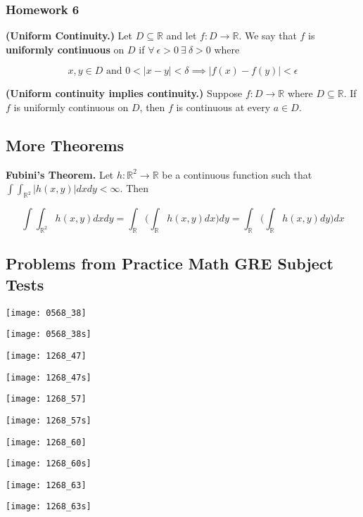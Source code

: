 \subsubsection{Homework 6}

\begin{definition} \textbf{(Uniform Continuity.)} Let \(D \subseteq \mathbb{R}\) and let \(f: D \to \mathbb{R}\). We say that \(f\) is \textbf{uniformly continuous} on \(D\) if \(\forall \ \epsilon > 0 \ \exists \ \delta > 0\) where

\[
x, y \in D \text{ and } 0 < |x - y| < \delta \implies |f(x) - f(y)| < \epsilon
\]

\end{definition}

\begin{theorem} \textbf{(Uniform continuity implies continuity.)} Suppose \(f:D \to \mathbb{R}\) where \(D \subseteq \mathbb{R}\). If \(f\) is uniformly continuous on \(D\), then \(f\) is continuous at every \(a \in D\).

\end{theorem}

\subsection{More Theorems}

\begin{theorem}\label{ra.fubini} \textbf{Fubini's Theorem.} Let \(h: \mathbb{R}^2 \to \mathbb{R}\) be a continuous function such that \(\int \int_{\mathbb{R}^2}|h(x,y)| dxdy < \infty\). Then

\[
\int \int_{\mathbb{R}^2} h(x,y)dxdy = \int_{\mathbb{R}} \bigg( \int_{\mathbb{R} } h(x,y)dx \bigg) dy = \int_{\mathbb{R}} \bigg( \int_{\mathbb{R}} h(x,y)dy \bigg) dx
\]

\end{theorem}

\subsection{Problems from Practice Math GRE Subject Tests}

%

\texttt{[image: 0568\_38]}

\texttt{[image: 0568\_38s]}

\texttt{[image: 1268\_47]}

\texttt{[image: 1268\_47s]}

\texttt{[image: 1268\_57]}

\texttt{[image: 1268\_57s]}

\texttt{[image: 1268\_60]}

\texttt{[image: 1268\_60s]}

\texttt{[image: 1268\_63]}

\texttt{[image: 1268\_63s]}

%